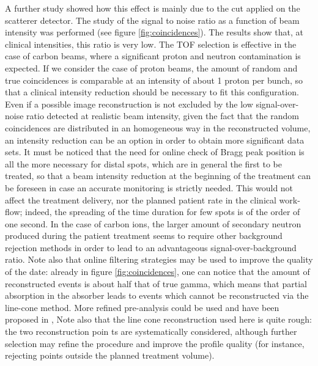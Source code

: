 A further study showed how this effect is mainly due to the cut applied on the scatterer detector. 
The study of the signal to noise ratio as a function of beam intensity was performed (see figure \ref{fig:coincidences}). The results show that, at clinical intensities, this ratio is very low. The TOF selection is effective in the case of carbon beams, where a significant proton and neutron contamination is expected. If we consider the case of proton beams, the amount of random and true coincidences is comparable at an intensity of about 1 proton per bunch, so that a clinical intensity reduction should be necessary to fit this configuration. Even if a possible image reconstruction is not excluded by the low signal-over-noise ratio detected at realistic beam intensity, given the fact that the random coincidences are distributed in an homogeneous way in the reconstructed volume, an intensity reduction can be an option in order to obtain more significant data sets. It must be noticed that the need for online check of Bragg peak position is all the more necessary for distal spots, which are in general the first to be treated, so that a beam intensity reduction at the beginning of the treatment can be foreseen in case an accurate monitoring is strictly needed. This would not affect the treatment delivery, nor the planned patient rate in the clinical work-flow; indeed, the spreading of the time duration for few spots is of the order of one second. 
In the case of carbon ions, the larger amount of secondary neutron produced during the patient treatment seems to require other background rejection methods in order to lead to an advantageous signal-over-background ratio. Note also that online filtering strategies  may be used to improve the quality of the date: already in figure \ref{fig:coincidences}, one can notice that the amount of reconstructed events is about half that of true gamma, which means that partial absorption in the absorber leads to events which cannot be reconstructed via the line-cone method. More refined pre-analysis could be used and have been proposed in \cite{Draeger:2017aa}, Note also that the line cone reconstruction used here is quite rough: the two reconstruction poin ts are systematically considered, although further selection may refine the procedure and improve the profile quality (for instance, rejecting points outside the planned treatment volume).

